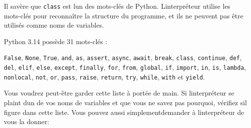 Il s\textquotesingle avère que \texttt{class} est l\textquotesingle un
des mots-clés de Python. L\textquotesingle interpréteur utilise les
mots-clés pour reconnaître la structure du programme, et ils ne peuvent
pas être utilisés comme noms de variables.

Python 3.14 possède 31 mots-clés :

\texttt{False}, \texttt{None}, \texttt{True}, \texttt{and}, \texttt{as},
\texttt{assert}, \texttt{async}, \texttt{await}, \texttt{break},
\texttt{class}, \texttt{continue}, \texttt{def}, \texttt{del},
\texttt{elif}, \texttt{else}, \texttt{except}, \texttt{finally},
\texttt{for}, \texttt{from}, \texttt{global}, \texttt{if},
\texttt{import}, \texttt{in}, \texttt{is}, \texttt{lambda},
\texttt{nonlocal}, \texttt{not}, \texttt{or}, \texttt{pass},
\texttt{raise}, \texttt{return}, \texttt{try}, \texttt{while},
\texttt{with} et \texttt{yield}.

Vous voudrez peut-être garder cette liste à portée de main. Si
l\textquotesingle interpréteur se plaint d\textquotesingle un de vos
noms de variables et que vous ne savez pas pourquoi, vérifiez
s\textquotesingle il figure dans cette liste. Vous pouvez aussi
simplementdemander à l\textquotesingle interpréteur de vous la donner:

